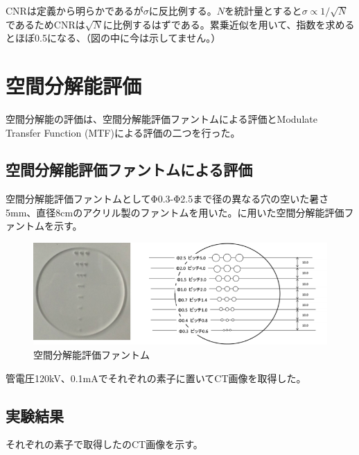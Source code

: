 CNRは定義から明らかであるが$\sigma$に反比例する。$N$を統計量とすると$\sigma\propto1/\sqrt{N}$であるためCNRは$\sqrt{N}$に比例するはずである。累乗近似を用いて、指数を求めるとほぼ0.5になる、（図の中に今は示してません。）
\fi

\section{空間分解能評価}

空間分解能の評価は、空間分解能評価ファントムによる評価とModulate Transfer Function (MTF)による評価の二つを行った。
\subsection{空間分解能評価ファントムによる評価}
空間分解能評価ファントムとしてΦ0.3-Φ2.5まで径の異なる穴の空いた暑さ5mm、直径8cmのアクリル製のファントムを用いた。に用いた空間分解能評価ファントムを示す。
\begin{figure}[H]
 \begin{center}
 \includegraphics[bb=0.000000 0.000000 350.850996 121.909922,width=1.0\hsize]{image2/chapter5/spatial_phantom.png}
 \end{center}
 \caption{空間分解能評価ファントム}
 \label{fig:spatial_phantom}
\end{figure}
管電圧120kV、0.1mAでそれぞれの素子に置いてCT画像を取得した。

\subsection{実験結果}

それぞれの素子で取得したのCT画像を示す。

